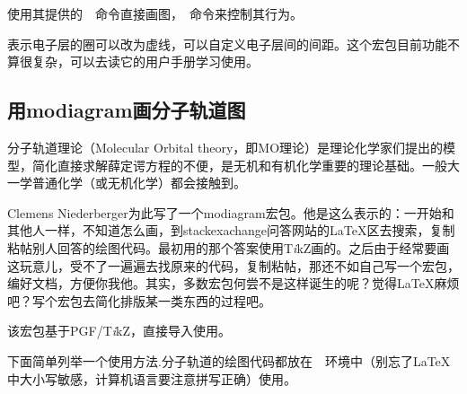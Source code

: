 \documentclass[a4paper,UTF8,zihao = -4]{ctexart} %
\providecommand{\tikzlg}{PGF/T\textit{i}kZ}
\newcommand{\tkznm}{T\textit{i}kZ}
\begin{document}
\begin{dispListing}
\usepackage{bohr} %
\end{dispListing}

使用其提供的~~命令直接画图，~命令来控制其行为。

\begin{dispExample}
\end{dispExample}

表示电子层的圈可以改为虚线，可以自定义电子层间的间距。这个宏包目前功能不算很复杂，可以去读它的用户手册学习使用。

\subsection{用\textsf{modiagram}画分子轨道图}
\label{sec:modiagram}

分子轨道理论（Molecular Orbital theory，即MO理论）是理论化学家们提出的模型，简化直接求解薛定谔方程的不便，是无机和有机化学重要的理论基础。一般大一学普通化学（或无机化学）都会接触到。

Clemens Niederberger为此写了一个\textsf{modiagram}宏包。他是这么表示的：一开始和其他人一样，不知道怎么画，到\textsf{stackexachange}问答网站的\LaTeX{}区去搜索，复制粘帖别人回答的绘图代码。最初用的那个答案使用\tkznm{}画的。之后由于经常要画这玩意儿，受不了一遍遍去找原来的代码，复制粘帖，那还不如自己写一个宏包，编好文档，方便你我他。其实，多数宏包何尝不是这样诞生的呢？觉得\LaTeX{}麻烦吧？写个宏包去简化排版某一类东西的过程吧。

该宏包基于\tikzlg{}，直接导入使用。

\begin{dispListing}
\usepackage{modiagram} %
\end{dispListing}

下面简单列举一个使用方法.分子轨道的绘图代码都放在~~环境中（别忘了\LaTeX{}中大小写敏感，计算机语言要注意拼写正确）使用。

\begin{dispExample}
\begin{MOdiagram}
\EnergyAxis[title = Energy]
\end{MOdiagram}
\end{dispExample}
\end{document}
